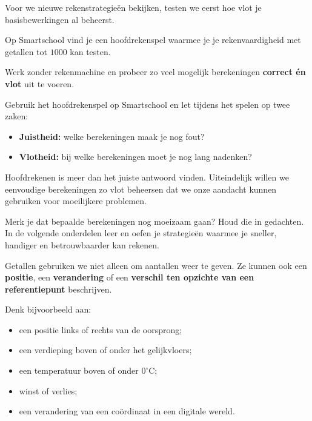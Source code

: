 \documentclass{ximera}
\begin{document}

Voor we nieuwe rekenstrategieën bekijken, testen we eerst hoe vlot je
basisbewerkingen al beheerst.

Op Smartschool vind je een hoofdrekenspel waarmee je je rekenvaardigheid
met getallen tot \(1000\) kan testen.

Werk zonder rekenmachine en probeer zo veel mogelijk berekeningen
\textbf{correct én vlot} uit te voeren.

\begin{opmerking}[Zelftest]

Gebruik het hoofdrekenspel op Smartschool en let tijdens het spelen op twee
zaken:

\begin{itemize}
    \item \textbf{Juistheid:} welke berekeningen maak je nog fout?
    \item \textbf{Vlotheid:} bij welke berekeningen moet je nog lang nadenken?
\end{itemize}

\end{opmerking}

Hoofdrekenen is meer dan het juiste antwoord vinden. Uiteindelijk willen we
eenvoudige berekeningen zo vlot beheersen dat we onze aandacht kunnen
gebruiken voor moeilijkere problemen.

Merk je dat bepaalde berekeningen nog moeizaam gaan? Houd die in gedachten.
In de volgende onderdelen leer en oefen je strategieën waarmee je sneller,
handiger en betrouwbaarder kan rekenen.




Getallen gebruiken we niet alleen om aantallen weer te geven.
Ze kunnen ook een \textbf{positie}, een \textbf{verandering} of een
\textbf{verschil ten opzichte van een referentiepunt} beschrijven.

Denk bijvoorbeeld aan:

\begin{itemize}
    \item een positie links of rechts van de oorsprong;
    \item een verdieping boven of onder het gelijkvloers;
    \item een temperatuur boven of onder \(0^\circ\text{C}\);
    \item winst of verlies;
    \item een verandering van een coördinaat in een digitale wereld.
\end{itemize}
\end{document}
